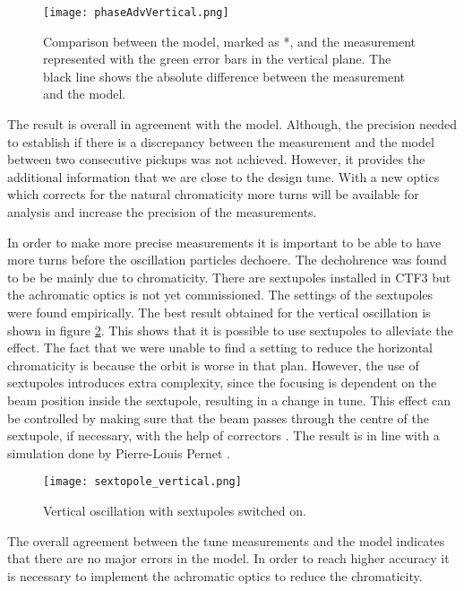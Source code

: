 \begin{figure}[!h]
\centering
\texttt{[image: phaseAdvVertical.png]}
\caption[Phase advance in the vertical plane]{Comparison between the model, marked as *, and the measurement represented with the green error bars in the vertical plane. The black line shows the absolute difference between the measurement and the model.\label{fig:phaseAdvVertical}}
\end{figure}
 
The result is overall in agreement with the model. Although, the precision needed to establish if there is a discrepancy between the measurement and the model between two consecutive pickups was not achieved. However, it provides the additional information that we are close to the design tune. With a new optics which corrects for the natural chromaticity more turns will be available for analysis and increase the precision of the measurements.
 
In order to make more precise measurements it is important to be able to have more turns before the oscillation particles dechoere. The dechohrence was found to be be mainly due to chromaticity. There are sextupoles installed in CTF3 but the achromatic optics is not yet commissioned. The settings of the sextupoles were found empirically. The best result obtained for the vertical oscillation is shown in figure \ref{fig:tune:sextopole_vertical}. This shows that it is possible to use sextupoles to alleviate the effect. The fact that we were unable to find a setting to reduce the horizontal chromaticity is because the orbit is worse in that plan. However, the use of sextupoles introduces extra complexity, since the focusing is dependent on the beam position inside the sextupole, resulting in a change in tune. This effect can be controlled by making sure that the beam passes through the centre of the sextupole, if necessary, with the help of correctors \cite{zimmermann_book}. The result is in line with a simulation done by Pierre-Louis Pernet \cite{pierre:tune}.    
 
\begin{figure}[!h]
\centering
\texttt{[image: sextopole\_vertical.png]}
\caption{Vertical oscillation with sextupoles switched on.  \label{fig:tune:sextopole_vertical}}
\end{figure}
 

The overall agreement between the tune measurements and the model indicates that there are no major errors in the model. In order to reach higher accuracy it is necessary to implement the achromatic optics to reduce the chromaticity.
 
